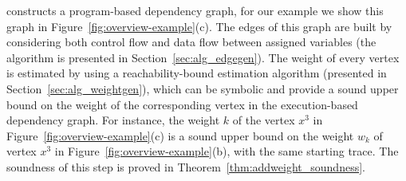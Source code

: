  {\THESYSTEM} constructs a program-based dependency graph, for our example we show this graph in Figure~\ref{fig:overview-example}(c). The edges of this graph are built by considering both control flow and data flow between assigned variables (the algorithm is presented in Section~\ref{sec:alg_edgegen}). The weight of every vertex is estimated by using a reachability-bound estimation algorithm (presented in Section~\ref{sec:alg_weightgen}), which can be symbolic and provide a sound upper bound on the weight of the corresponding vertex in the execution-based dependency graph. For instance, the weight $k$ of the vertex $x^{3}$ in Figure~\ref{fig:overview-example}(c) is a sound upper bound on the weight $w_k$ of vertex $x^{3}$ in Figure~\ref{fig:overview-example}(b), with the same starting trace. The soundness of this step is proved in Theorem~\ref{thm:addweight_soundness}.
%
